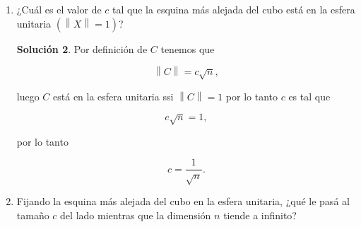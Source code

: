\documentclass[letterpaper]{article}
\theoremstyle{definition}
\theoremstyle{lemathm}
\theoremstyle{lemathm}
\newtheorem{sol}{Solución}
\theoremstyle{lemathm}
\theoremstyle{lemademthm}
\newcommand{\pars}[1]{\left( #1 \right) }
\newcommand{\norm}[1]{\left\lVert#1\right\rVert}
\newcommand{\1}{\mathbbm{1}}
\begin{document}
\begin{enumerate}
\begin{enumerate}
\begin{sol}
				Ahora por definición $x_i \leq c$ para todo $i$, por lo tanto

				\[\norm{X} \leq \sum_{i=1}^n c,\]

				por definición de $e_i$ y la norma euclideana esto es

				\[\norm{X} \leq \sum_{i=1}^n \norm{c\pars{e_i}},\]

				finalmente al tener la base canónica vectores unitarios obtenemos

				\[\norm{X} \leq c\sqrt{n}.\]

				Ahora el punto $C = (c,c,\cdots,c)$ en el cubo tiene como norma

				\[\norm{C} = c\sqrt{n}.\]

				Con lo que obtenemos que $C$ es un punto en el cubo cuya norma es la más grande. 
				
				Supongamos que existe otro punto $D = \pars{d_1,\cdots, d_n}$ en el cubo y distinto a $C$ cuya norma sea igual a la de $C$, por definición del cubo algún $d_j$ deberá ser menor a $c$. Luego que al ser $0\leq d_i\leq c$ entonces $d_i^2 \leq c^2$ y además como $d_j^2 < c^2$ entonces

				\[\sum_{i=1}^n d_i^2 < \sum_{i=1}^n c^2,\]

				finalmente como la raiz cuadrado es una función monótona y creciente concluimos que

				\[\norm{D} < \norm{C},\]

				lo cuál es una contradicción. Con lo que concluimos que $C$ es el punto más alejado.
			\end{sol}
			\item ¿Cuál es el valor de $c$ tal que la esquina más alejada del cubo está en la esfera unitaria $(\norm{X}=1)$?
			
			\begin{sol}
				Por definición de $C$ tenemos que

				\[\norm{C} = c\sqrt{n},\]

				luego $C$ está en la esfera unitaria ssi $\norm{C} = 1$ por lo tanto $c$ es tal que

				\[c\sqrt{n} = 1,\]

				por lo tanto

				\[c = \frac{1}{\sqrt{n}}.\]

			\end{sol}
			\item Fijando la esquina más alejada del cubo en la esfera unitaria, ¿qué le pasá al tamaño $c$ del lado mientras que la dimensión $n$ tiende a infinito?
			

\end{enumerate}
\end{enumerate}
\end{document}
